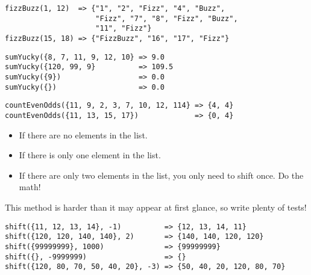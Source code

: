     \begin{verbatim}
fizzBuzz(1, 12)  => {"1", "2", "Fizz", "4", "Buzz",
                     "Fizz", "7", "8", "Fizz", "Buzz",
                     "11", "Fizz"}
fizzBuzz(15, 18) => {"FizzBuzz", "16", "17", "Fizz"}
    \end{verbatim}

\begin{verbatim}
sumYucky({8, 7, 11, 9, 12, 10} => 9.0
sumYucky({120, 99, 9}          => 109.5
sumYucky({9})                  => 0.0
sumYucky({})                   => 0.0
\end{verbatim}

\begin{verbatim}
countEvenOdds({11, 9, 2, 3, 7, 10, 12, 114} => {4, 4}
countEvenOdds({11, 13, 15, 17})             => {0, 4}
\end{verbatim}

\begin{itemize}
    \item If there are no elements in the list.
    \item If there is only one element in the list.
    \item If there are only two elements in the list, you only need to shift once. Do the math!
\end{itemize}
    
This method is harder than it may appear at first glance, so write plenty of tests!
\begin{verbatim}
shift({11, 12, 13, 14}, -1)          => {12, 13, 14, 11}
shift({120, 120, 140, 140}, 2)       => {140, 140, 120, 120}
shift({99999999}, 1000)              => {99999999}
shift({}, -9999999)                  => {}
shift({120, 80, 70, 50, 40, 20}, -3) => {50, 40, 20, 120, 80, 70}
\end{verbatim}

